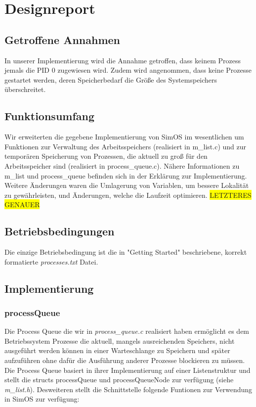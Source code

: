 \section{Designreport}
\subsection{Getroffene Annahmen}
In unserer Implementierung wird die Annahme getroffen, dass keinem Prozess jemals die PID 0 zugewiesen wird. Zudem wird angenommen, dass keine Prozesse gestartet werden, deren Speicherbedarf die Größe des Systemspeichers überschreitet.

\subsection{Funktionsumfang}
Wir erweiterten die gegebene Implementierung von SimOS im wesentlichen um Funktionen zur Verwaltung des Arbeitsspeichers (realisiert in m\_list.c) und zur temporären Speicherung von Prozessen, die aktuell zu groß für den Arbeitsspeicher sind (realisiert in process\_queue.c).
Nähere Informationen zu m\_list und process\_queue befinden sich in der Erklärung zur Implementierung.
Weitere Änderungen waren die Umlagerung von Variablen, um bessere Lokalität zu gewährleisten, und Änderungen, welche die Laufzeit optimieren.
\colorbox{yellow}{LETZTERES GENAUER}

\subsection{Betriebsbedingungen}
Die einzige Betriebsbedingung ist die in "Getting Started" beschriebene, korrekt formatierte \textit{processes.txt} Datei.


\subsection{Implementierung}

\subsubsection{processQueue}
Die Process Queue die wir in \textit{process\_queue.c} realisiert haben ermöglicht es dem Betriebssystem Prozesse die aktuell, mangels ausreichenden Speichers, nicht ausgeführt werden können in einer Warteschlange zu Speichern und später aufzuführen ohne dafür die Ausführung anderer Prozesse blockieren zu müssen.
Die Process Queue basiert in ihrer Implementierung auf einer Listenstruktur und stellt die structs processQueue und processQueueNode zur verfügung (siehe \textit{m\_list.h}).
Desweiteren stellt die Schnittstelle folgende Funtionen zur Verwendung in SimOS zur verfügung:

